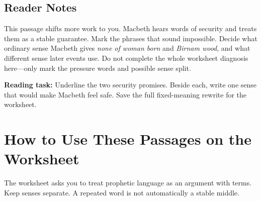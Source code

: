 \documentclass[12pt]{article}
\begin{document}
\subsection*{Reader Notes}

This passage shifts more work to you. Macbeth hears words of security and treats them as a stable guarantee. Mark the phrases that sound impossible. Decide what ordinary sense Macbeth gives \textit{none of woman born} and \textit{Birnam wood}, and what different sense later events use. Do not complete the whole worksheet diagnosis here---only mark the pressure words and possible sense split.

\textbf{Reading task:} Underline the two security promises. Beside each, write one sense that would make Macbeth feel safe. Save the full fixed-meaning rewrite for the worksheet.

\section*{How to Use These Passages on the Worksheet}

The worksheet asks you to treat prophetic language as an argument with terms. Keep senses separate. A repeated word is not automatically a stable middle.
\end{document}
